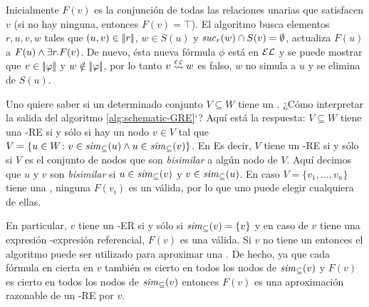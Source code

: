 Inicialmente $F(v)$ es la conjunci\'on de todas las relaciones unarias que
satisfacen $v$ (si no hay ninguna, entonces $F(v)=\top$).
El algoritmo busca elementos $r,u,v,w$ tales que
$(u,v)\in|\!|r|\!|$, $w\in S(u)$ y ${\it suc}_{r}(w)\cap
S(v)=\emptyset$, actualiza $F(u)$ a $F(u)\wedge\exists r. F(v)$.
De nuevo, \'esta nueva f\'ormula $\phi$ est\'a en $\mathcal{EL}$ y se puede mostrar que
$v\in|\!|\varphi|\!|$ y $w\notin|\!|\varphi|\!|$, por lo tanto $v\simil{\EL} w$ es falso, $w$ no simula a $u$ y se elimina de $S(u)$.

\iffullversion Uno quiere saber si un determinado conjunto  $V\subseteq W$
tiene un \posre. ¿C\'omo interpretar la salida del algoritmo
\ref{alg:schematic-GRE}`? Aqu\'i est\'a la respuesta: $V\subseteq W$ tiene una
\EL-RE si y s\'olo si hay un nodo $v\in V$ tal que  $V=\{u\in W\colon
v\in{\it sim}_\subseteq(u) \wedge u\in{\it sim}_\subseteq(v)\}$. En
Es decir, $V$ tiene un \EL-RE si y s\'olo si $V$ es el conjunto de nodos que son
\emph{bisimilar} a alg\'un nodo de $V$. Aqu\'i decimos que $u$ y $v$
son \emph{bisimilar} si $u\in{\it sim}_\subseteq(v)$ y
$v\in{\it sim}_\subseteq(u)$. En caso  $V=\{v_1,\dots,v_n\}$ tiene una
\posre, ninguna $F(v_i)$ es un \posre v\'alida, por lo que uno puede elegir cualquiera de ellas.

En particular, $v$ tiene un \EL-ER si y s\'olo si ${\it sim}_\subseteq(v)=\{v\}$
y en caso de $v$ tiene una expresi\'on \EL-expresi\'on referencial, $F(v)$ es una v\'alida. Si $v$ no tiene un \posre entonces el algoritmo puede ser
utilizado para aproximar una \posre. De hecho, ya que cada f\'ormula en cierta en $v$
tambi\'en es cierto en todos los nodos de ${\it sim}_\subseteq(v)$ y $F(v)$
es cierto en todos los nodos de ${\it sim}_\subseteq(v)$ entonces $F(v)$ es una
aproximaci\'on razonable de un \EL-RE por $v$.


